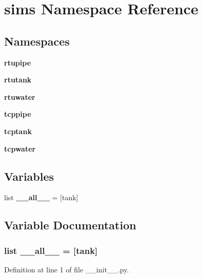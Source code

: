 \section{sims Namespace Reference}
\label{namespacesims}
\subsection*{Namespaces}
\begin{DoxyCompactItemize}
\item 
 {\bf rtupipe}
\item 
 {\bf rtutank}
\item 
 {\bf rtuwater}
\item 
 {\bf tcppipe}
\item 
 {\bf tcptank}
\item 
 {\bf tcpwater}
\end{DoxyCompactItemize}
\subsection*{Variables}
\begin{DoxyCompactItemize}
\item 
list {\bf \+\_\+\+\_\+all\+\_\+\+\_\+} = [\textquotesingle{}tank\textquotesingle{}]
\end{DoxyCompactItemize}


\subsection{Variable Documentation}
\subsubsection[{\+\_\+\+\_\+all\+\_\+\+\_\+}]{\setlength{\rightskip}{0pt plus 5cm}list \+\_\+\+\_\+all\+\_\+\+\_\+ = [\textquotesingle{}tank\textquotesingle{}]}\label{namespacesims_aa4a022e6ddacd362b83964da5cc5d044}


Definition at line 1 of file \+\_\+\+\_\+init\+\_\+\+\_\+.\+py.

